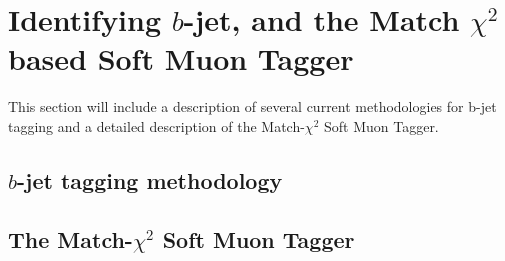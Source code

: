 \chapter{Identifying $b$-jet, and the Match $\chi^{2}$ based Soft Muon Tagger} \label{sec:smt_summary}
This section will include a description of several current methodologies for b-jet tagging
and a detailed description of the Match-$\chi^{2}$ Soft Muon Tagger.
\section{$b$-jet tagging methodology} \label{sec:b_jet_tagging_methodology}
\section{The Match-$\chi^{2}$ Soft Muon Tagger} \label{sec:smt_tagger}
